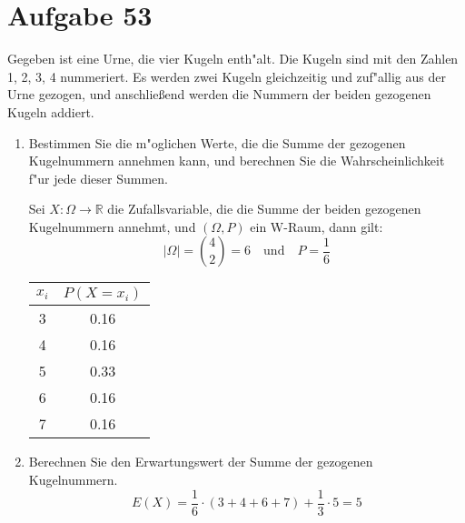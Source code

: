 \section{Aufgabe 53}
\setcounter{section}{53}

Gegeben ist eine Urne, die vier Kugeln enth"alt. Die Kugeln sind mit den Zahlen
1, 2, 3, 4 nummeriert. Es werden zwei Kugeln gleichzeitig und zuf"allig aus der
Urne gezogen, und anschlie{\ss}end werden die Nummern der beiden gezogenen
Kugeln addiert.
\begin{enumerate}
    \item Bestimmen Sie die m"oglichen Werte, die die Summe der gezogenen
        Kugelnummern annehmen kann, und berechnen Sie die Wahrscheinlichkeit
        f"ur jede dieser Summen.

        Sei $X : \Omega \rightarrow \mathbb{R}$ die Zufallsvariable, die die
        Summe der beiden gezogenen Kugelnummern annehmt, und $(\Omega, P)$ ein
        W-Raum, dann gilt:
        \begin{equation*}
            |\Omega| = \binom{4}{2} = 6 \quad\text{und}\quad P = \dfrac{1}{6}
        \end{equation*}
        \begin{table*}[h]
            \centering
            \begin{tabular}{c|c}
                $x_i$ & $P(X = x_i)$ \\
                \hline
                3 & 0.16 \\
                4 & 0.16 \\
                5 & 0.33 \\
                6 & 0.16 \\
                7 & 0.16 \\
            \end{tabular}
        \end{table*}
    \item Berechnen Sie den Erwartungswert der Summe der gezogenen Kugelnummern.
        \begin{equation*}
            E(X) = \dfrac{1}{6} \cdot (3 + 4 + 6 + 7) + \dfrac{1}{3} \cdot 5 = 5
        \end{equation*}
\end{enumerate}
